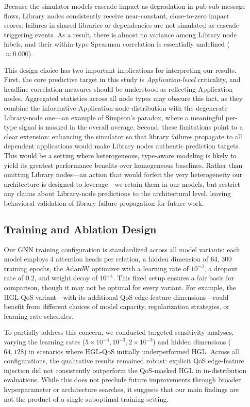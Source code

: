 \documentclass[sigconf,9pt,anonymous]{acmart}
\begin{document}
Because the simulator models cascade impact as degradation in pub-sub message flows, Library nodes consistently receive near-constant, close-to-zero impact scores: failures in shared libraries or dependencies are not simulated as cascade-triggering events. As a result, there is almost no variance among Library node labels, and their within-type Spearman correlation is essentially undefined ($\approx 0.000$).

This design choice has two important implications for interpreting our results. First, the core predictive target in this study is \emph{Application-level} criticality, and headline correlation measures should be understood as reflecting Application nodes. Aggregated statistics across all node types may obscure this fact, as they combine the informative Application-node distribution with the degenerate Library-node one—an example of Simpson's paradox, where a meaningful per-type signal is masked in the overall average. Second, these limitations point to a clear extension: enhancing the simulator so that library failures propagate to all dependent applications would make Library nodes authentic prediction targets. This would be a setting where heterogeneous, type-aware modeling is likely to yield its greatest performance benefits over homogeneous baselines. Rather than omitting Library nodes—an action that would forfeit the very heterogeneity our architecture is designed to leverage—we retain them in our models, but restrict any claims about Library-node predictions to the architectural level, leaving behavioral validation of library-failure propagation for future work.

\subsection{Training and Ablation Design}

Our GNN training configuration is standardized across all model variants: each model employs 4 attention heads per relation, a hidden dimension of 64, 300 training epochs, the AdamW optimizer with a learning rate of $10^{-3}$, a dropout rate of 0.2, and weight decay of $10^{-4}$. This fixed setup ensures a fair basis for comparison, though it may not be optimal for every variant. For example, the HGL-QoS variant—with its additional QoS edge-feature dimensions—could benefit from different choices of model capacity, regularization strategies, or learning-rate schedules.

To partially address this concern, we conducted targeted sensitivity analyses, varying the learning rates (${5\times10^{-4}, 10^{-3}, 2\times10^{-3}}$) and hidden dimensions (${64, 128}$) in scenarios where HGL-QoS initially underperformed HGL. Across all configurations, the qualitative results remained robust: explicit QoS edge-feature injection did not consistently outperform the QoS-masked HGL in in-distribution evaluations. While this does not preclude future improvements through broader hyperparameter or architecture searches, it suggests that our main findings are not the product of a single suboptimal training setting.
\end{document}
